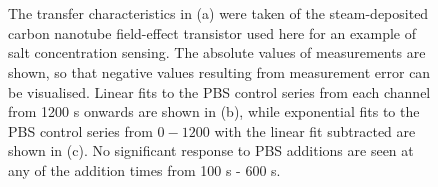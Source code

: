 \documentclass[
  a4paper,
]{scrbook}
\begin{document}
\begin{figure}
\begin{minipage}[t]{0.50\linewidth}
{{}

}

\subcaption{\label{fig-linear-fit}}
\end{minipage}%
\newline
\begin{minipage}[t]{0.28\linewidth}

{\centering 

~

}

\end{minipage}%
%
\begin{minipage}[t]{0.45\linewidth}

{\centering 


}

\subcaption{\label{fig-exp-fit}}
\end{minipage}%
%
\begin{minipage}[t]{0.28\linewidth}

{\centering 

~

}

\end{minipage}%

\caption{\label{fig-salt-conc-control-series}The transfer
characteristics in (a) were taken of the steam-deposited carbon nanotube
field-effect transistor used here for an example of salt concentration
sensing. The absolute values of measurements are shown, so that negative
values resulting from measurement error can be visualised. Linear fits
to the PBS control series from each channel from 1200 s onwards are
shown in (b), while exponential fits to the PBS control series from
\(0-1200\) with the linear fit subtracted are shown in (c). No
significant response to PBS additions are seen at any of the addition
times from 100 s - 600 s.}

\end{figure}
\end{document}
